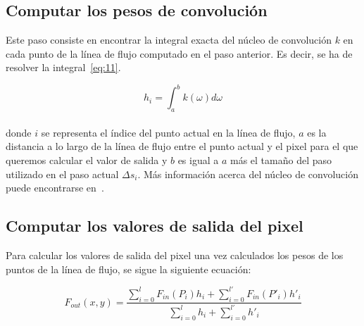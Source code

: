 \subsection{Computar los pesos de convolución}
\label{ref:convolution}

Este paso consiste en encontrar la integral exacta del núcleo de convolución $k$
en cada punto de la línea de flujo computado en el paso anterior. Es decir, se
ha de resolver la integral~\eqref{eq:11}.

\begin{equation}
		h_i = \int_{a}^{b}k(\omega) d\omega \label{eq:11}
\end{equation}\\

donde $i$ se representa el índice del punto actual en la línea de flujo, $a$
es la distancia a lo largo de la línea de flujo entre el punto actual y el pixel
para el que queremos calcular el valor de salida y $b$ es igual a $a$ más el
tamaño del paso utilizado en el paso actual $\Delta s_i$. Más información acerca
del núcleo de convolución puede encontrarse en~\citet{osti_10185520}.

\subsection{Computar los valores de salida del pixel}
\label{ref:salida}

Para calcular los valores de salida del pixel una vez calculados los pesos de
los puntos de la línea de flujo, se sigue la siguiente ecuación:

\begin{equation}
		F_{out}(x,y) =
		\frac{\sum\limits_{i=0}^{l}{F_{in}(P_i)h_i}+\sum\limits_{i=0}^{l'}{F_{in}(P'_i)h'_i}}{\sum\limits_{i=0}^{l}{h_i} + \sum\limits_{i=0}^{l'}{h'_i}} \label{eq:12}
\end{equation}

